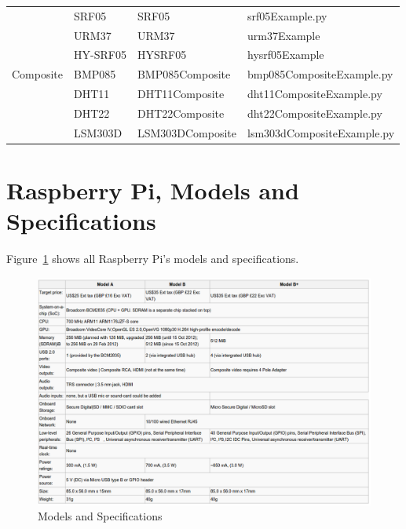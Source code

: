 \documentclass{acm_proc_article-sp}
\begin{document}
\begin{table}[ht]
\begin{tabular}{|l|l|l|l|}
                & SRF05           & SRF05                & srf05Example.py                \\
                & URM37           & URM37                & urm37Example                   \\
                & HY-SRF05        & HYSRF05              & hysrf05Example                 \\ \hline
Composite       & BMP085          & BMP085Composite      & bmp085CompositeExample.py      \\
                & DHT11           & DHT11Composite       & dht11CompositeExample.py       \\
                & DHT22           & DHT22Composite       & dht22CompositeExample.py       \\
                & LSM303D         & LSM303DComposite     & lsm303dCompositeExample.py    \\ \hline
\end{tabular}
\end{table}

\clearpage
\section{Raspberry Pi, Models and Specifications}\label{sec:Implem}
Figure~\ref{fig:modelSpec} shows all Raspberry Pi's models and specifications.
\begin{figure}[h]
	\centering
    \includegraphics[width=1.0\textwidth,natwidth=610,natheight=642]{pictures/modelSpecification.png}
	\caption[Caption for LOF]{Models and Specifications\protect\footnotemark}    
    \label{fig:modelSpec}
\end{figure}


\balancecolumns
\end{document}
